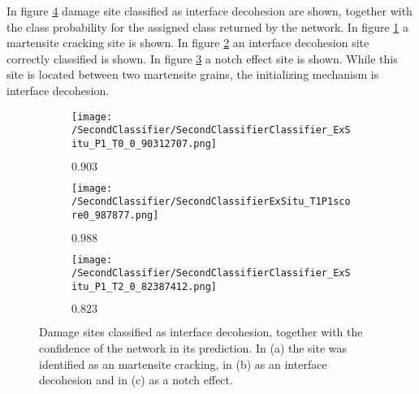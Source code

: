 In figure \ref{fig:ExSituInterfaceDecohesionSamples} damage site classified as interface decohesion are shown, together with the class probability for the assigned class returned by the network. In figure \ref{sub:ExSituInterfaceDecohesionSamplesM} a martensite cracking site is shown. In figure \ref{sub:ExSituInterfaceDecohesionSamplesID} an interface decohesion site correctly classified is shown. In figure \ref{sub:ExSituInterfaceDecohesionSamplesN} a notch effect site is shown. While this site is located between two martensite grains, the initializing mechanism is interface decohesion. 


\begin{figure}[H]
\centering
\begin{subfigure}{0.3\textwidth}
\texttt{[image: /SecondClassifier/SecondClassifierClassifier\_ExSitu\_P1\_T0\_0\_90312707.png]}
\caption{$0.903$}
\label{sub:ExSituInterfaceDecohesionSamplesM}
\end{subfigure}
\begin{subfigure}{0.3\textwidth}
\texttt{[image: /SecondClassifier/SecondClassifierExSitu\_T1P1score0\_987877.png]}
\caption{$0.988$}
\label{sub:ExSituInterfaceDecohesionSamplesID}
\end{subfigure}
\begin{subfigure}{0.3\textwidth}
\texttt{[image: /SecondClassifier/SecondClassifierClassifier\_ExSitu\_P1\_T2\_0\_82387412.png]}
\caption{$0.823$}
\label{sub:ExSituInterfaceDecohesionSamplesN}
\end{subfigure}
\caption{Damage sites classified as interface decohesion, together with the confidence of the network in its prediction. In (a) the site was identified as an martensite cracking, in (b) as an interface decohesion and in (c) as a notch effect. }
\label{fig:ExSituInterfaceDecohesionSamples}
\end{figure}

